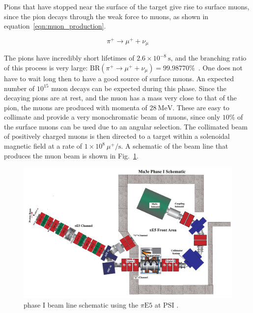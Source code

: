 Pions that have stopped near the surface of the target give rise to surface muons, since the pion decays through the weak force to muons, as shown in equation~\ref{eqn:muon_production}.

\begin{equation}
\label{eqn:muon_production}
\pi^+ \rightarrow \mu^+ + \nu_\mu
\end{equation}

\noindent The pions have incredibly short lifetimes of $2.6 \times 10^{-8}~\textrm{s}$, and the branching ratio of this process is very large: $\textrm{BR}(\pi^+ \rightarrow \mu^+ + \nu_\mu) = 99.98770\%$~\cite{Agashe:2014kda}.
One does not have to wait long then to have a good source of surface muons.
An expected number of $10^{15}$ muon decays can be expected during this phase.
Since the decaying pions are at rest, and the muon has a mass very close to that of the pion, the muons are produced with momenta of $28~\textrm{MeV}$.
These are easy to collimate and provide a very monochromatic beam of muons, since only $10\%$ of the surface muons can be used due to an angular selection.
The collimated beam of positively charged muons is then directed to a target within a solenoidal magnetic field at a rate of $1 \times 10^8~\mu^+/\textrm{s}$.
A schematic of the beam line that produces the muon beam is shown in Fig.~\ref{fig:mu3e_phaseI_schematic}.

\begin{figure}[h]
    \centering
    \includegraphics[width = \textwidth]{Figures/experiments/mu3e_phase1_schematic.png}
    \caption[\mueee phase I beam line schematic using the $\pi\textrm{E5}$ at PSI.]{\mueee phase I beam line schematic using the $\pi\textrm{E5}$ at PSI \cite{Blondel:2013ia}.}
    \label{fig:mu3e_phaseI_schematic}
\end{figure}

